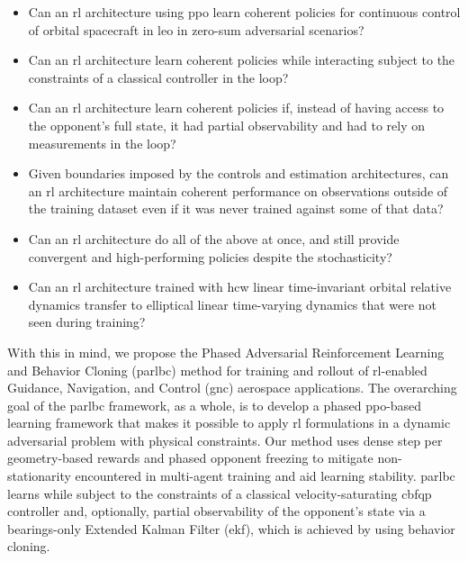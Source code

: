 \begin{itemize}
    \item Can an \acs{rl} architecture using \acs{ppo} learn coherent policies for continuous control of orbital spacecraft in \acs{leo} in zero-sum adversarial scenarios?
    \item Can an \acs{rl} architecture learn coherent policies while interacting subject to the constraints of a classical controller in the loop?
    \item Can an \acs{rl} architecture learn coherent policies if, instead of having access to the opponent's full state, it had partial observability and had to rely on measurements in the loop?
    \item Given boundaries imposed by the controls and estimation architectures, can an \acs{rl} architecture maintain coherent performance on observations outside of the training dataset even if it was never trained against some of that data?
    \item Can an \acs{rl} architecture do all of the above at once, and still provide convergent and high-performing policies despite the stochasticity?
    \item Can an \acs{rl} architecture trained with \acs{hcw} linear time-invariant orbital relative dynamics transfer to elliptical linear time-varying dynamics that were not seen during training?
\end{itemize}


With this in mind, we propose the Phased Adversarial Reinforcement Learning and Behavior Cloning (\acs{parlbc}) method for training and rollout of \acs{rl}-enabled Guidance, Navigation, and Control (\acs{gnc}) aerospace applications. The overarching goal of the \acs{parlbc} framework, as a whole, is  to develop a phased \acs{ppo}-based learning framework that makes it possible to apply \acs{rl} formulations in a dynamic adversarial problem with physical constraints. Our method uses dense step per geometry-based rewards and phased opponent freezing to mitigate non-stationarity encountered in multi-agent training and aid learning stability. \acs{parlbc} learns while subject to the constraints of a classical velocity-saturating \acs{cbfqp} controller and, optionally, partial observability of the opponent's state via a bearings-only Extended Kalman Filter (\acs{ekf}), which is achieved by using behavior cloning.


